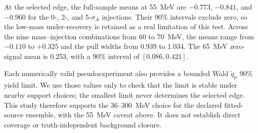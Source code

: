 At the selected edge, the full-sample means at 55~MeV are $-0.773$, $-0.841$, and
$-0.960$ for the 0-, 2-, and 5-$\sigma_A$ injections.  Their 90\% intervals exclude
zero, so the low-mass under-recovery is retained as a real limitation of this test.
Across the nine mass--injection combinations from 60 to 70~MeV, the means range from
$-0.110$ to $+0.325$ and
the pull widths from 0.939 to 1.034.  The 65~MeV zero-signal mean is 0.253, with a
90\% interval of $[0.086,0.421]$.

Each numerically valid pseudoexperiment also provides a bounded Wald
$\widetilde q_\mu$ 90\% \CLs{} yield
limit.  We use those values only to check that the limit is stable under nearby support
choices; the smallest limit never determines the selected edge.  This study therefore
supports the 36--300~MeV choice for the declared fitted-source ensemble, with the
55~MeV caveat above.  It does not establish direct coverage or truth-independent
background closure.

\FloatBarrier
